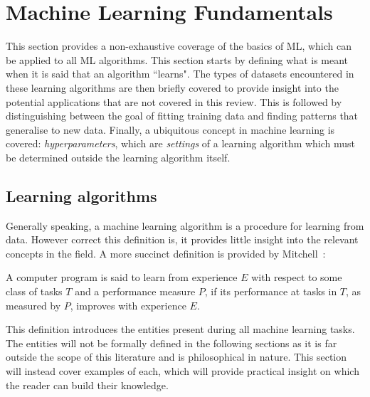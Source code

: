 \section{Machine Learning Fundamentals}
This section provides a non-exhaustive coverage of the basics of \gls{ML}, which can be applied to all \gls{ML} algorithms. This section starts by defining what is meant when it is said that an algorithm ``learns". The types of datasets encountered in these learning algorithms are then briefly covered to provide insight into the potential applications that are not covered in this review. This is followed by distinguishing between the goal of fitting training data and finding patterns that generalise to new data. Finally, a ubiquitous concept in machine learning is covered: \textit{hyperparameters}, which are \textit{settings} of a learning algorithm which must be determined outside the learning algorithm itself.

\subsection{Learning algorithms\label{ssec:learning_algo}}
Generally speaking, a machine learning algorithm is a procedure for learning from data. However correct this definition is, it provides little insight into the relevant concepts in the field. A more succinct definition is provided by Mitchell~\cite{Mitchell97LearningAlgorithm}:

\begin{fancyquotes}
    A computer program is said to learn from experience $E$ with respect
    to some class of tasks $T$ and a performance measure $P$, if its performance
    at tasks in $T$, as measured by $P$, improves with experience $E$.
\end{fancyquotes}

This definition introduces the entities present during all
machine learning tasks. The entities will not be formally defined in the
following sections as it is far outside the scope of this literature and is
philosophical in nature. This section will instead cover examples of each, which
will provide practical insight on which the reader can build their knowledge.

